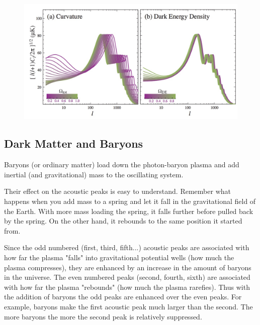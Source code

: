 \documentclass{article}
\begin{document}
\begin{figure}
\begin{center}
\includegraphics[width=\textwidth]{curvature_de}
\end{center}
\caption{}
\label{DE_curv}
\end{figure}

\subsection{Dark Matter and Baryons}
Baryons (or ordinary matter) load down the photon-baryon plasma and add inertial (and gravitational) mass to the oscillating system.

Their effect on the acoustic peaks is easy to understand.  Remember what happens when you add mass to a spring and let it fall in the gravitational field of the Earth.  With more mass loading the spring, it falls further before pulled back by the spring.  On the other hand, it rebounds to the same position it started from. 

Since the odd numbered (first, third, fifth...) acoustic peaks are associated with how far the plasma "falls" into gravitational potential wells (how much the plasma compresses), they are enhanced by an increase in the amount of baryons in the universe.   The even numbered peaks (second, fourth, sixth) are associated with how far the plasma "rebounds" (how much the plasma rarefies).  Thus with the addition of baryons the odd peaks are enhanced over the even peaks.  For example, baryons make the first acoustic peak much larger than the second.  The more baryons the more the second peak is relatively suppressed. 
\par
\end{document}
